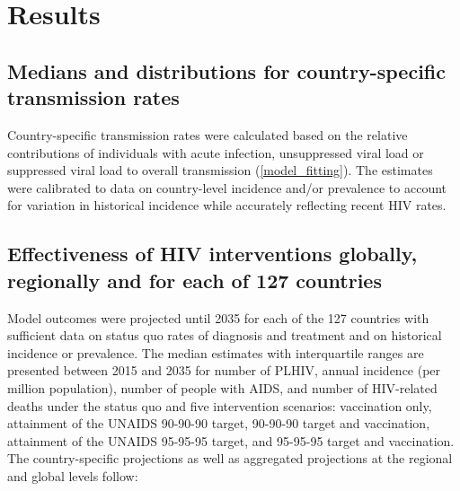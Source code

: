 \documentclass[11pt]{article}
\begin{document}
\section{Results}

\subsection{Medians and distributions for country-specific
  transmission rates}
\label{transmission_rate}
Country-specific transmission rates were calculated based on the
relative contributions of individuals with acute infection,
unsuppressed viral load or suppressed viral load to overall
transmission (\autoref{model_fitting}). The estimates were calibrated
to data on country-level incidence and/or prevalence to account for
variation in historical incidence while accurately reflecting recent
HIV rates.


\subsection{Effectiveness of HIV interventions globally, regionally
  and for each of 127 countries}

Model outcomes were projected until 2035 for each of the 127 countries
with sufficient data on status quo rates of diagnosis and treatment
and on historical incidence or prevalence. The median estimates with
interquartile ranges are presented between 2015 and 2035 for number of
PLHIV, annual incidence (per million population), number of people
with AIDS, and number of HIV-related deaths under the status quo and
five intervention scenarios: vaccination only, attainment of the
UNAIDS 90-90-90 target, 90-90-90 target and vaccination, attainment of
the UNAIDS 95-95-95 target, and 95-95-95 target and vaccination.  The
country-specific projections as well as aggregated projections at the
regional and global levels follow:





\end{document}
